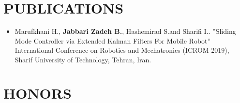 \documentclass[10pt,a4paper,sans]{moderncv} %
\begin{document}


	\section{PUBLICATIONS}

	\begin{itemize}
	    \item Marufkhani H., \textbf{Jabbari Zadeh B.}, Hashemirad S.and Sharifi I.. ”Sliding Mode Controller via Extended
Kalman Filters For Mobile Robot” International Conference on Robotics and Mechatronics (ICROM
2019), Sharif University of Technology, Tehran, Iran.
	\end{itemize}
	


	

	\section{HONORS}
	
\end{document}
